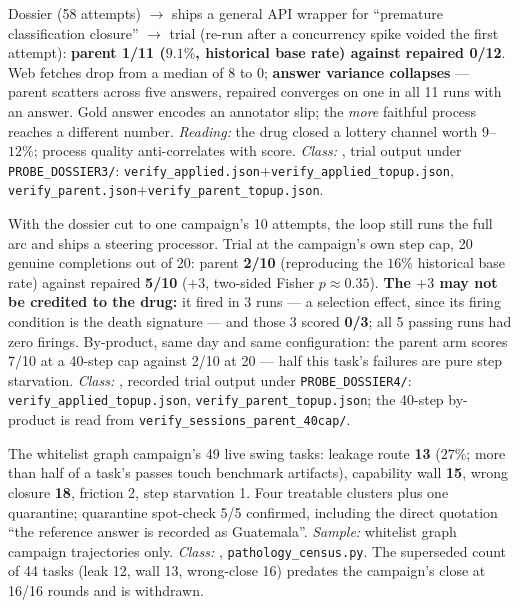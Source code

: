 \begin{description}[leftmargin=0pt,labelindent=0pt,labelsep=0pt,style=nextline,font=\normalfont,itemsep=6pt]
\item[\textbf{F29}\quad Whole-pipeline re-run on a low-base-rate task.]
Dossier (58 attempts) $\to$ ships a general API wrapper for
``premature classification closure'' $\to$ trial (re-run after a
concurrency spike voided the first attempt): \textbf{parent
1/11 ($9.1\%$, historical base rate) against repaired 0/12}. Web
fetches drop from a median of 8 to 0; \textbf{answer variance
collapses} --- parent scatters across five answers, repaired converges
on one in all 11 runs with an answer. Gold answer encodes an annotator
slip; the \emph{more} faithful process reaches a different number.
\emph{Reading:} the drug closed a lottery channel worth $9$--$12\%$;
process quality anti-correlates with score.
\emph{Class:} , trial output under \texttt{PROBE\_DOSSIER3/}:
\texttt{verify\_applied.json}$+$\texttt{verify\_applied\_topup.json},
\texttt{verify\_parent.json}$+$\texttt{verify\_parent\_topup.json}.

\item[\textbf{F30}\quad Single-campaign memory, whole pipeline.]
With the dossier cut to one campaign's 10 attempts, the loop still runs the
full arc and ships a steering processor. Trial at the campaign's own step
cap, 20 genuine completions out of 20: parent \textbf{2/10} (reproducing
the $16\%$ historical base rate) against repaired \textbf{5/10}
($+3$, two-sided Fisher $p \approx 0.35$). \textbf{The $+3$ may not be credited to
the drug:} it fired in 3 runs --- a selection effect, since its firing
condition is the death signature --- and those 3 scored \textbf{0/3};
all 5 passing runs had zero firings. By-product, same day and same
configuration: the parent arm scores 7/10 at a 40-step cap against 2/10 at
20 --- half this task's failures are pure step starvation.
\emph{Class:} , recorded trial output under
\texttt{PROBE\_DOSSIER4/}: \texttt{verify\_applied\_topup.json},
\texttt{verify\_parent\_topup.json}; the 40-step by-product is read from
\texttt{verify\_sessions\_parent\_40cap/}.

\item[\textbf{F31}\quad Pathology census.]
The whitelist graph campaign's 49 live swing tasks: leakage route
\textbf{13} ($27\%$; more than half of a task's passes touch benchmark
artifacts), capability wall \textbf{15}, wrong closure
\textbf{18}, friction 2, step starvation 1. Four treatable clusters plus
one quarantine; quarantine spot-check 5/5 confirmed, including the direct
quotation ``the reference answer is recorded as Guatemala''.
\emph{Sample:} whitelist graph campaign trajectories only.
\emph{Class:} , \texttt{pathology\_census.py}. The superseded
count of 44 tasks (leak 12, wall 13, wrong-close 16) predates the
campaign's close at 16/16 rounds and is withdrawn.


\end{description}
